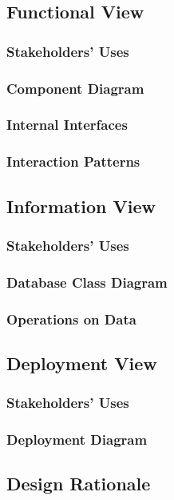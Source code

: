 \documentclass[a4paper]{article}
\begin{document}
    \subsection{Functional View}
    \subsubsection{Stakeholders' Uses}
    \lipsum[1-1]
    \subsubsection{Component Diagram}
    \subsubsection{Internal Interfaces}
    \lipsum[1-1]
    \subsubsection{Interaction Patterns}
    \lipsum[1-1]
    \subsection{Information View}
    \subsubsection{Stakeholders' Uses}
    \lipsum[1-1]
    \subsubsection{Database Class Diagram}
    \subsubsection{Operations on Data}
    \lipsum[1-1]
    \subsection{Deployment View}
    \subsubsection{Stakeholders' Uses}
    \lipsum[1-1]
    \subsubsection{Deployment Diagram}
    \subsection{Design Rationale}
    \lipsum[1-1]
    
\end{document}
